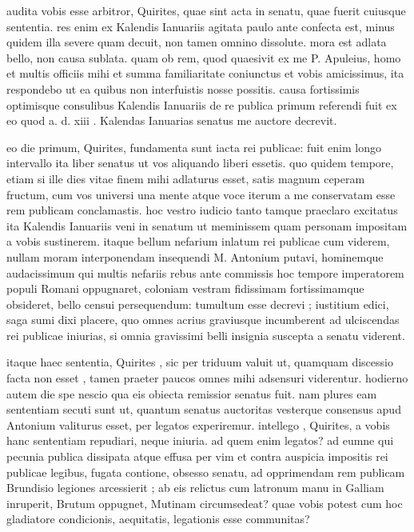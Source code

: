 
 audita vobis esse arbitror, Quirites, quae sint acta in senatu, quae fuerit cuiusque sententia. res enim ex Kalendis Ianuariis agitata paulo ante confecta est, minus quidem illa severe quam decuit, non tamen omnino dissolute. mora est adlata bello, non causa sublata. quam ob rem, quod quaesivit ex me P. Apuleius, homo et multis officiis mihi et summa familiaritate coniunctus et vobis amicissimus, ita respondebo ut ea quibus non interfuistis nosse possitis. causa fortissimis optimisque consulibus Kalendis Ianuariis de re publica primum referendi fuit ex eo quod a. d. xiii . Kalendas Ianuarias senatus me auctore decrevit.

 eo die primum, Quirites, fundamenta sunt iacta rei publicae: fuit enim longo intervallo ita liber senatus ut vos aliquando liberi essetis. quo quidem tempore, etiam si ille dies vitae finem mihi adlaturus esset, satis magnum ceperam fructum, cum vos universi una mente atque voce iterum a me conservatam esse rem publicam conclamastis. hoc vestro iudicio tanto tamque praeclaro excitatus ita Kalendis Ianuariis veni in senatum ut meminissem quam personam impositam a vobis sustinerem. itaque bellum nefarium inlatum rei publicae cum viderem, nullam moram interponendam insequendi M. Antonium putavi, hominemque audacissimum qui multis nefariis rebus ante commissis hoc tempore imperatorem populi Romani oppugnaret, coloniam vestram fidissimam fortissimamque obsideret, bello censui persequendum: tumultum esse decrevi ; iustitium edici, saga sumi dixi placere, quo omnes acrius graviusque incumberent ad ulciscendas rei publicae iniurias, si omnia gravissimi belli insignia suscepta a senatu viderent.

 itaque haec sententia, Quirites , sic per triduum valuit ut, quamquam discessio facta non esset , tamen praeter paucos omnes mihi adsensuri viderentur. hodierno autem die spe nescio qua eis obiecta remissior senatus fuit. nam plures eam sententiam secuti sunt ut, quantum senatus auctoritas vesterque consensus apud Antonium valiturus esset, per legatos experiremur. intellego , Quirites, a vobis hanc sententiam repudiari, neque iniuria. ad quem enim legatos? ad eumne qui pecunia publica dissipata atque effusa per vim et contra auspicia impositis rei publicae legibus, fugata contione, obsesso senatu, ad opprimendam rem publicam Brundisio legiones arcessierit ; ab eis relictus cum latronum manu in Galliam inruperit, Brutum oppugnet, Mutinam circumsedeat? quae vobis potest cum hoc gladiatore condicionis, aequitatis, legationis esse communitas?

